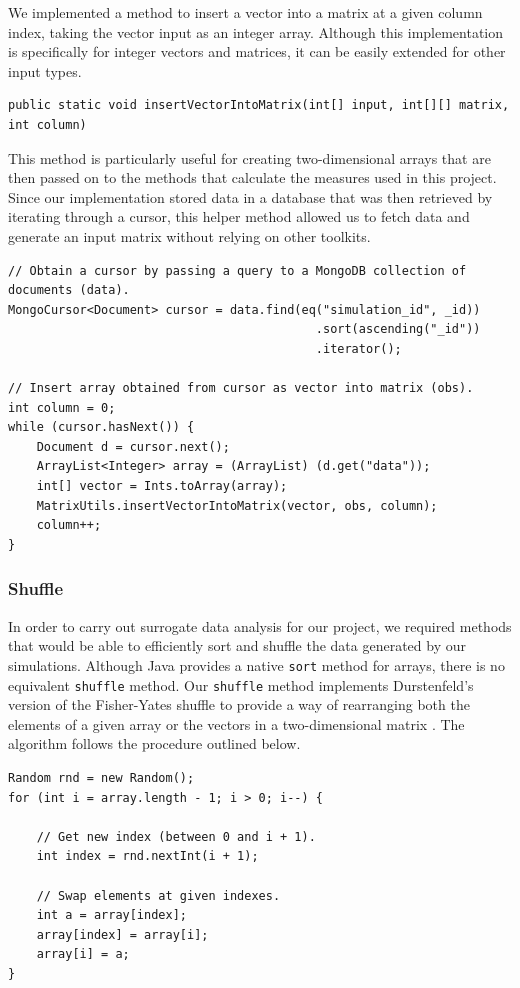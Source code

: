 \documentclass[a4paper,11pt]{article}
\begin{document}
We implemented a method to insert a vector into a matrix at a given column index, taking the vector input as an integer array. Although this implementation is specifically for integer vectors and matrices, it can be easily extended for other input types.

\begin{verbatim}
public static void insertVectorIntoMatrix(int[] input, int[][] matrix, int column)
\end{verbatim}

This method is particularly useful for creating two-dimensional arrays that are then passed on to the methods that calculate the measures used in this project. Since our implementation stored data in a database that was then retrieved by iterating through a cursor, this helper method allowed us to fetch data and generate an input matrix without relying on other toolkits.

\begin{verbatim}
// Obtain a cursor by passing a query to a MongoDB collection of documents (data).
MongoCursor<Document> cursor = data.find(eq("simulation_id", _id))
                                           .sort(ascending("_id"))
                                           .iterator();

// Insert array obtained from cursor as vector into matrix (obs).
int column = 0;
while (cursor.hasNext()) {
	Document d = cursor.next();
	ArrayList<Integer> array = (ArrayList) (d.get("data"));
	int[] vector = Ints.toArray(array);
	MatrixUtils.insertVectorIntoMatrix(vector, obs, column);
	column++;
}
\end{verbatim}

\subsubsection{Shuffle}
\label{sec:impl:shuffle}

In order to carry out surrogate data analysis for our project, we required methods that would be able to efficiently sort and shuffle the data generated by our simulations. Although Java provides a native \texttt{sort} method for arrays, there is no equivalent \texttt{shuffle} method. Our \texttt{shuffle} method implements Durstenfeld's version of the Fisher-Yates shuffle to provide a way of rearranging both the elements of a given array or the vectors in a two-dimensional matrix \cite{Durstenfeld1964}. The algorithm follows the procedure outlined below.

\begin{verbatim}
Random rnd = new Random();
for (int i = array.length - 1; i > 0; i--) {

	// Get new index (between 0 and i + 1).
	int index = rnd.nextInt(i + 1);

	// Swap elements at given indexes.
	int a = array[index];
	array[index] = array[i];
	array[i] = a;
}
\end{verbatim}
\end{document}
